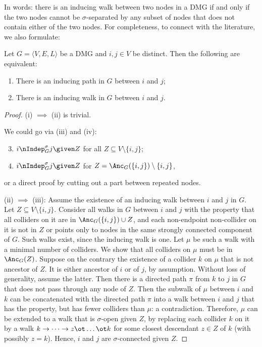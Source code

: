 In words: there is an inducing walk between two nodes in a DMG if and only if the two nodes cannot be $\sigma$-separated by any subset of nodes that does not contain either of the two nodes.
For completeness, to connect with the literature, we also formulate:
\begin{Prp}\label{prp:inducing_path_or_walk}
  Let $G = \langle V,E,L \rangle$ be a DMG and $i,j \in V$ be distinct. Then the following are equivalent:
  \begin{enumerate}[label=(\roman*)]
    \item There is an inducing path in $G$ between $i$ and $j$;
    \item There is an inducing walk in $G$ between $i$ and $j$.
  \end{enumerate}
\end{Prp}
\begin{proof}
  (i) $\implies$ (ii) is trivial.

  We could go via (iii) and (iv):
  \begin{enumerate}[label=(\roman*)]\setcounter{enumi}{2}
    \item $i \nIndep^\sigma_G j \given Z$ for all $Z \subseteq V \setminus \{i,j\}$;
    \item $i \nIndep^\sigma_G j \given Z$ for $Z = \Anc_G(\{i,j\}) \setminus \{i,j\}$,
  \end{enumerate}
  or a direct proof by cutting out a part between repeated nodes.

  (ii) $\implies$ (iii): Assume the existence of an inducing walk between $i$ and $j$ in $G$. 
  Let $Z \subseteq V\setminus\{i,j\}$. 
  Consider all walks in $G$ between $i$ and $j$ with the property that all colliders on it are in $\Anc_{G}({\{i,j\}) \cup Z}$, and each non-endpoint non-collider on it is not in $Z$ or points only to nodes in the same strongly connected component of $G$.
  Such walks exist, since the inducing walk is one. 
  Let $\mu$ be such a walk with a minimal number of colliders.
  We show that all colliders on $\mu$ must be in $\Anc_{G}(Z)$. 
  Suppose on the contrary the existence of a collider $k$ on $\mu$ that is not ancestor of $Z$. 
  It is either ancestor of $i$ or of $j$, by assumption.
  Without loss of generality, assume the latter.
  Then there is a directed path $\pi$ from $k$ to $j$ in $G$ that does not pass through any node of $Z$. 
  Then the subwalk of $\mu$ between $i$ and $k$ can be concatenated with the directed path $\pi$
  into a walk between $i$ and $j$ that has the property, but has fewer colliders than $\mu$: a contradiction. 
  Therefore, $\mu$ can be extended to a walk that is $\sigma$-open given $Z$, by replacing each collider $k$ on
  it by a walk $k \to \dots \to z \ot \dots \ot k$ for some closest descendant $z \in Z$ of $k$ (with possibly $z=k$).
  Hence, $i$ and $j$ are $\sigma$-connected given $Z$.


\end{proof}
